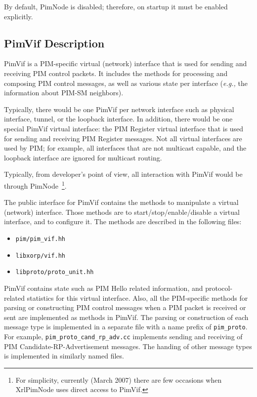 \documentclass[11pt]{article}
\newcommand{\eg}{\emph{e.g.,}\xspace}
\begin{document}
By default, PimNode is disabled; therefore, on startup it must be enabled
explicitly.

\subsection{PimVif Description}

PimVif is a PIM-specific virtual (network) interface that is used for sending
and receiving PIM control packets. It includes the methods for processing and
composing PIM control messages, as well as various state per interface
(\eg the information about PIM-SM neighbors).

Typically, there would be one PimVif per network interface such as
physical interface, tunnel, or the loopback
interface. In addition, there would be one special PimVif virtual
interface: the PIM Register virtual interface that is used for sending
and receiving PIM Register messages. Not all virtual interfaces are
used by PIM; for example, all interfaces that are not multicast
capable, and the loopback interface are ignored for multicast
routing.

Typically, from developer's point of view, all interaction with PimVif
would be through PimNode~\footnote{For simplicity, currently (March 2007)
there are few occasions when XrlPimNode uses direct access to PimVif.}.

The public interface for PimVif contains the methods to manipulate a
virtual (network) interface. Those methods are to start/stop/enable/disable a
virtual interface, and to configure it. The methods are described in
the following files:

\begin{itemize}
  \item \verb=pim/pim_vif.hh=
  \item \verb=libxorp/vif.hh=
  \item \verb=libproto/proto_unit.hh=
\end{itemize}

PimVif contains state such as PIM Hello related information, and
protocol-related statistics for this virtual interface. Also, all
the PIM-specific methods for parsing or constructing PIM control
messages when a PIM packet is received or sent are implemented as
methods in PimVif. The parsing or construction of each message type is
implemented in a separate file with a name prefix of \verb=pim_proto=.
For example, \verb=pim_proto_cand_rp_adv.cc= implements sending and
receiving of PIM Candidate-RP-Advertisement messages. The handing of
other message types is implemented in similarly named files.
\end{document}

